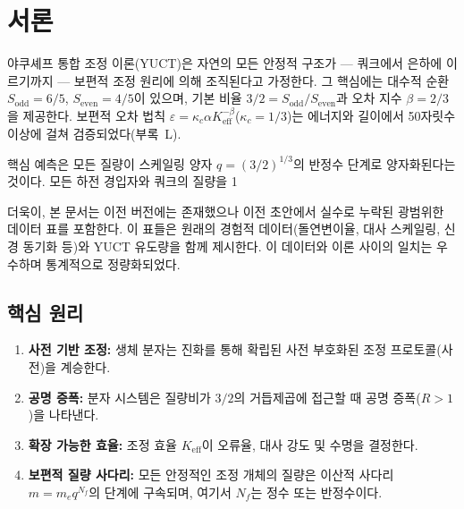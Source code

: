 \documentclass[11pt,a4paper]{article}
\begin{document}
	\tableofcontents
	\newpage
	
	\section{서론}
	
	야쿠셰프 통합 조정 이론(YUCT)은 자연의 모든 안정적 구조가 — 쿼크에서 은하에 이르기까지 — 보편적 조정 원리에 의해 조직된다고 가정한다. 그 핵심에는 대수적 순환 \(S_{\mathrm{odd}} = 6/5\), \(S_{\mathrm{even}} = 4/5\)이 있으며, 기본 비율 \(3/2 = S_{\mathrm{odd}}/S_{\mathrm{even}}\)과 오차 지수 \(\beta = 2/3\)을 제공한다. 보편적 오차 법칙 \(\varepsilon = \kappa_c \alpha K_{\mathrm{eff}}^{-\beta}\)(\(\kappa_c = 1/3\))는 에너지와 길이에서 50자릿수 이상에 걸쳐 검증되었다(부록~L).
	
	핵심 예측은 모든 질량이 스케일링 양자 \(q = (3/2)^{1/3}\)의 반정수 단계로 양자화된다는 것이다. 모든 하전 경입자와 쿼크의 질량을 1%
	
	더욱이, 본 문서는 이전 버전에는 존재했으나 이전 초안에서 실수로 누락된 광범위한 데이터 표를 포함한다. 이 표들은 원래의 경험적 데이터(돌연변이율, 대사 스케일링, 신경 동기화 등)와 YUCT 유도량을 함께 제시한다. 이 데이터와 이론 사이의 일치는 우수하며 통계적으로 정량화되었다.
	
	\subsection{핵심 원리}
	
	\begin{enumerate}
		\item \textbf{사전 기반 조정:} 생체 분자는 진화를 통해 확립된 사전 부호화된 조정 프로토콜(사전)을 계승한다.
		\item \textbf{공명 증폭:} 분자 시스템은 질량비가 \(3/2\)의 거듭제곱에 접근할 때 공명 증폭(\(R > 1\))을 나타낸다.
		\item \textbf{확장 가능한 효율:} 조정 효율 \(K_{\mathrm{eff}}\)이 오류율, 대사 강도 및 수명을 결정한다.
		\item \textbf{보편적 질량 사다리:} 모든 안정적인 조정 개체의 질량은 이산적 사다리 \(m = m_e q^{N_f}\)의 단계에 구속되며, 여기서 \(N_f\)는 정수 또는 반정수이다.
	\end{enumerate}
	
\end{document}
